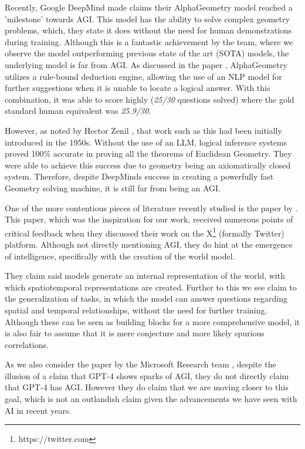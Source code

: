 \documentclass{article}
\theoremstyle{plain}
\theoremstyle{definition}
\theoremstyle{remark}
\begin{document}
Recently, Google DeepMind made claims their AlphaGeometry model \cite{trinh2024geometry} reached a 'milestone' towards AGI. This model has the ability to solve complex geometry problems, which, they state it does without the need for human demonstrations during training. Although this is a fantastic achievement by the team, where we observe the model outperforming previous state of the art (SOTA) models, the underlying model is far from AGI. As discussed in the paper \cite{trinh2024geometry}, AlphaGeometry utilizes a rule-bound deduction engine, allowing the use of an NLP model for further suggestions when it is unable to locate a logical answer. With this combination, it was able to score highly (\textit{25/30} questions solved) where the gold standard human equivalent was \textit{25.9/30}.

However, as noted by Hector Zenil \cite{hector2024linkedin}, that work such as this had been initially introduced in the 1950s. Without the use of an LLM, logical inference systems proved 100\% accurate in proving all the theorems of Euclidean Geometry. They were able to achieve this success due to geometry being an axiomatically closed system. Therefore, despite DeepMinds success in creating a powerfully fast Geometry solving machine, it is still far from being an AGI.

One of the more contentious pieces of literature recently studied is the paper by \cite{gurnee2023language}. This paper, which was the inspiration for our work, received numerous points of critical feedback when they discussed their work on the X\footnote{https://twitter.com} (formally Twitter) platform. Although not directly mentioning AGI, they do hint at the emergence of intelligence, specifically with the creation of the world model.

They claim said models generate an internal representation of the world, with which spatiotemporal representations are created. Further to this we see claim to the generalization of tasks, in which the model can answer questions regarding spatial and temporal relationships, without the need for further training. Although these can be seen as building blocks for a more comprehensive model, it is also fair to assume that it is mere conjecture and more likely spurious correlations.

As we also consider the paper by the Microsoft Research team \cite{}, despite the illusion of a claim that GPT-4 shows sparks of AGI, they do not directly claim that GPT-4 has AGI. However they do claim that we are moving closer to this goal, which is not an outlandish claim given the advancements we have seen with AI in recent years.
\end{document}
